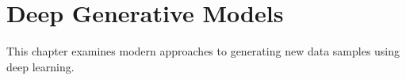 
\chapter{Deep Generative Models}
\label{chap:deep-generative-models}

This chapter examines modern approaches to generating new data samples using deep learning.







